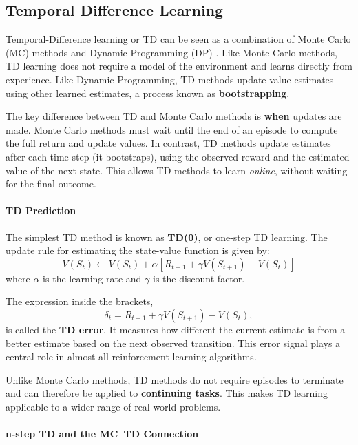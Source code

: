 \subsection{Temporal Difference Learning}

Temporal-Difference learning or TD can be seen as a combination of Monte Carlo (MC) methods and Dynamic Programming (DP) \cite{sutton}. Like Monte Carlo methods, TD learning does not require a model of the environment and learns directly from experience. Like Dynamic Programming, TD methods update value estimates using other learned estimates, a process known as \textbf{bootstrapping}.

The key difference between TD and Monte Carlo methods is \textbf{when} updates are made. Monte Carlo methods must wait until the end of an episode to compute the full return and update values. In contrast, TD methods update estimates after each time step (it bootstraps), using the observed reward and the estimated value of the next state. This allows TD methods to learn \emph{online}, without waiting for the final outcome.




\paragraph{TD Prediction}

The simplest TD method is known as \textbf{TD(0)}, or one-step TD learning. The update rule for estimating the state-value function is given by:
\[
V(S_t) \leftarrow V(S_t) + \alpha \left[ R_{t+1} + \gamma V(S_{t+1}) - V(S_t) \right]
\]
where $\alpha$ is the learning rate and $\gamma$ is the discount factor.





The expression inside the brackets,
\[
\delta_t = R_{t+1} + \gamma V(S_{t+1}) - V(S_t),
\]
is called the \textbf{TD error}. It measures how different the current estimate is from a better estimate based on the next observed transition. This error signal plays a central role in almost all reinforcement learning algorithms.



Unlike Monte Carlo methods, TD methods do not require episodes to terminate and can therefore be applied to \textbf{continuing tasks}. This makes TD learning applicable to a wider range of real-world problems.






\paragraph{n-step TD and the MC--TD Connection}

